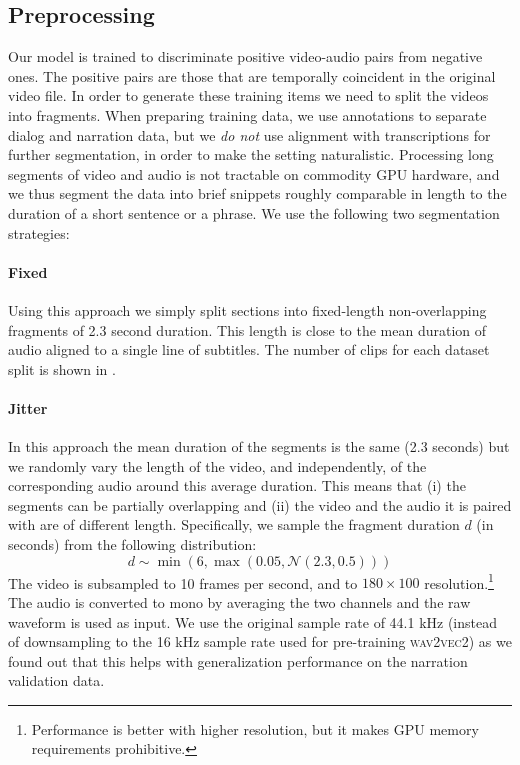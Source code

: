 \subsection{Preprocessing}
\label{sec:preprocessing}
Our model is trained to discriminate positive video-audio pairs from
negative ones.  The positive pairs are those that are temporally
coincident in the original video file. In order to generate these
training items we need to split the videos into fragments.  When
preparing training data, we use annotations to separate dialog and
narration data, but we \emph{do not} use alignment with
transcriptions for further segmentation, in order to make the setting
naturalistic. Processing long segments of video and audio is not
tractable on commodity GPU hardware, and we thus segment the data into
brief snippets roughly comparable in length to the duration of a short
sentence or a phrase. We use the following two segmentation
strategies:

\paragraph{Fixed} Using this approach we simply split sections into
fixed-length non-overlapping fragments of 2.3 second duration. This
length is close to the mean duration of audio aligned to a single line
of subtitles. The number of clips for each dataset split is shown in 
.

\paragraph{Jitter} In this approach the mean duration of the segments
is the same (2.3 seconds) but we randomly vary the length of the
video, and independently, of the corresponding audio around this
average duration. This means that (i) the segments can be partially
overlapping and (ii) the video and the audio it is paired with are
of different length. Specifically, we sample the fragment
duration $d$ (in seconds)
from the following distribution:
\begin{equation}
  d \sim \min(6, \max(0.05, \mathcal{N}(2.3, 0.5)))
  \label{eq:jitter}
\end{equation}
The video is subsampled to 10 frames per second, and to
$180\times 100$ resolution.\footnote{Performance is better with higher
  resolution, but it makes GPU memory
  requirements prohibitive.}  The audio is converted to mono by
averaging the two channels and the raw waveform is used as input. We
use the original sample rate of 44.1 kHz (instead of downsampling to
the 16 kHz sample rate used for pre-training \textsc{wav2vec2}) as we
found out that this helps with generalization performance on the
narration validation data.

